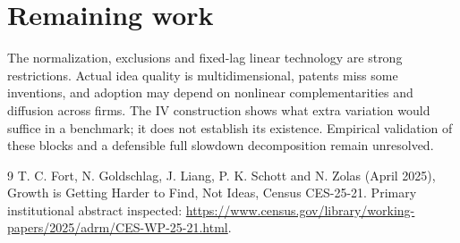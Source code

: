 \documentclass[11pt]{article}
\begin{document}
\section*{Remaining work}
The normalization, exclusions and fixed-lag linear technology are strong restrictions. Actual idea quality is multidimensional, patents miss some inventions, and adoption may depend on nonlinear complementarities and diffusion across firms. The IV construction shows what extra variation would suffice in a benchmark; it does not establish its existence. Empirical validation of these blocks and a defensible full slowdown decomposition remain unresolved.
\begin{thebibliography}{9}
 T. C. Fort, N. Goldschlag, J. Liang, P. K. Schott and N. Zolas (April 2025), Growth is Getting Harder to Find, Not Ideas, Census CES-25-21. Primary institutional abstract inspected:
\url{https://www.census.gov/library/working-papers/2025/adrm/CES-WP-25-21.html}.
\end{thebibliography}
\end{document}
